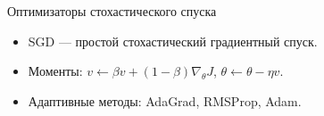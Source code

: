 \documentclass[notheorems, handout]{beamer}
\begin{document}
\begin{frame}{Оптимизаторы стохастического спуска}
  \begin{itemize}
    \item SGD --- простой стохастический градиентный спуск.
    \item Моменты: $v\leftarrow \beta v + (1-\beta)\nabla_\theta J$, $\theta\leftarrow\theta-\eta v$.
    \item Адаптивные методы: AdaGrad, RMSProp, Adam.
  \end{itemize}
\end{frame}
\end{document}
